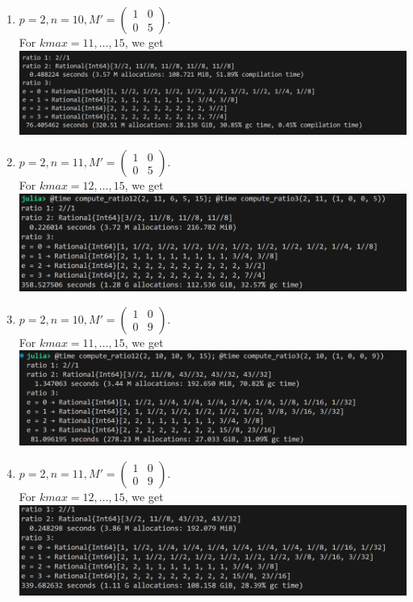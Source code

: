 \documentclass[letterpaper,12pt]{article}
\begin{document}
\begin{enumerate}
\item $p=2, n=10, M' = \begin{pmatrix}
1 & 0 \\ 0 & 5
\end{pmatrix}.$ \\
For $kmax = 11, \dots, 15$, we get \\
\includegraphics[scale=0.4]{ex5.png} \\

\item $p=2, n=11, M' = \begin{pmatrix}
1 & 0 \\ 0 & 5
\end{pmatrix}.$ \\
For $kmax = 12, \dots, 15$, we get \\
\includegraphics[scale=0.4]{ex8.png} \\

\item $p=2, n=10, M' = \begin{pmatrix}
1 & 0 \\ 0 & 9
\end{pmatrix}.$ \\
For $kmax = 11, \dots, 15$, we get \\
\includegraphics[scale=0.4]{ex6.png} \\

\item $p=2, n=11, M' = \begin{pmatrix}
1 & 0 \\ 0 & 9
\end{pmatrix}.$ \\
For $kmax = 12, \dots, 15$, we get \\
\includegraphics[scale=0.4]{ex7.png} \\


\end{enumerate}
\end{document}

